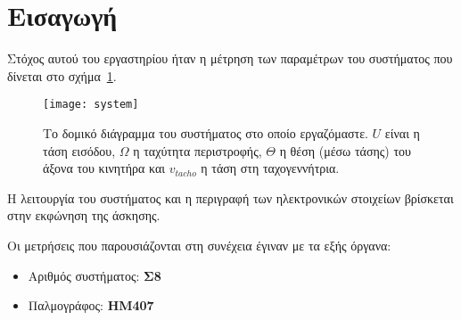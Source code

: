 \section{Εισαγωγή}
Στόχος αυτού του εργαστηρίου ήταν η μέτρηση των παραμέτρων του συστήματος που δίνεται στο σχήμα~\ref{fig:system}.
\begin{figure}[htb]
    \centering
    \texttt{[image: system]}
    \caption[Το δομικό διάγραμμα του συστήματος στο οποίο εργαζόμαστε]%
    {Το δομικό διάγραμμα του συστήματος στο οποίο εργαζόμαστε.
    $U$ είναι η τάση εισόδου, $\Omega$ η ταχύτητα περιστροφής, $\Theta$ η θέση (μέσω τάσης) του άξονα του κινητήρα και $v_{tacho}$ η τάση στη ταχογεννήτρια.}
    \label{fig:system}
\end{figure}
Η λειτουργία του συστήματος και η περιγραφή των ηλεκτρονικών στοιχείων βρίσκεται στην εκφώνηση της άσκησης.

Οι μετρήσεις που παρουσιάζονται στη συνέχεια έγιναν με τα εξής όργανα:
\begin{itemize}
    \item Αριθμός συστήματος: \textbf{Σ8}
    \item Παλμογράφος: \textbf{HM407}
\end{itemize}
